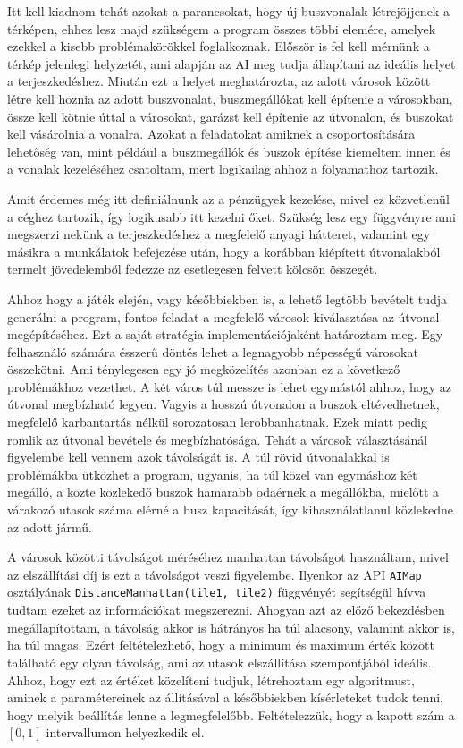 Itt kell kiadnom tehát azokat a parancsokat, hogy új buszvonalak létrejöjjenek a térképen, ehhez lesz majd szükségem a program összes többi elemére, amelyek ezekkel a kisebb problémakörökkel foglalkoznak. Először is fel kell mérnünk a térkép jelenlegi helyzetét, ami alapján az AI meg tudja állapítani az ideális helyet a terjeszkedéshez. Miután ezt a helyet meghatározta, az adott városok között létre kell hoznia az adott buszvonalat, buszmegállókat kell építenie a városokban, össze kell kötnie úttal a városokat, garázst kell építenie az útvonalon, és buszokat kell vásárolnia a vonalra. Azokat a feladatokat amiknek a csoportosítására lehetőség van, mint például a buszmegállók és buszok építése kiemeltem innen és a vonalak kezeléséhez csatoltam, mert logikailag ahhoz a folyamathoz tartozik.

Amit érdemes még itt definiálnunk az a pénzügyek kezelése, mivel ez közvetlenül a céghez tartozik, így logikusabb itt kezelni őket. Szükség lesz egy függvényre ami megszerzi nekünk a terjeszkedéshez a megfelelő anyagi hátteret, valamint egy másikra a munkálatok befejezése után, hogy a korábban kiépített útvonalakból termelt jövedelemből fedezze az esetlegesen felvett kölcsön összegét.


Ahhoz hogy a játék elején, vagy későbbiekben is, a lehető legtöbb bevételt tudja generálni a program, fontos feladat a megfelelő városok kiválasztása az útvonal megépítéséhez. Ezt a saját stratégia implementációjaként határoztam meg. Egy felhasználó számára ésszerű döntés lehet a legnagyobb népességű városokat összekötni. Ami ténylegesen egy jó megközelítés azonban ez a következő problémákhoz vezethet. A két város túl messze is lehet egymástól ahhoz, hogy az útvonal megbízható legyen. Vagyis a hosszú útvonalon a buszok eltévedhetnek, megfelelő karbantartás nélkül sorozatosan lerobbanhatnak. Ezek miatt pedig romlik az útvonal bevétele és megbízhatósága. Tehát a városok választásánál figyelembe kell vennem azok távolságát is. A túl rövid útvonalakkal is problémákba ütközhet a program, ugyanis, ha túl közel van egymáshoz két megálló, a közte közlekedő buszok hamarabb odaérnek a megállókba, mielőtt a várakozó utasok száma elérné a busz kapacitását, így kihasználatlanul közlekedne az adott jármű.

A városok közötti távolságot méréséhez manhattan távolságot használtam, mivel az elszállítási díj is ezt a távolságot veszi figyelembe. Ilyenkor az API \texttt{AIMap} osztályának \texttt{DistanceManhattan(tile1, tile2)} függvényét segítségül hívva tudtam ezeket az információkat megszerezni. Ahogyan azt az előző bekezdésben megállapítottam, a távolság akkor is hátrányos ha túl alacsony, valamint akkor is, ha túl magas. Ezért feltételezhető, hogy a minimum és maximum érték között található egy olyan távolság, ami az utasok elszállítása szempontjából ideális. Ahhoz, hogy ezt az értéket közelíteni tudjuk, létrehoztam egy algoritmust, aminek a paramétereinek az állításával a későbbiekben kísérleteket tudok tenni, hogy melyik beállítás lenne a legmegfelelőbb. Feltételezzük, hogy a kapott szám a $[0, 1]$ intervallumon helyezkedik el.

